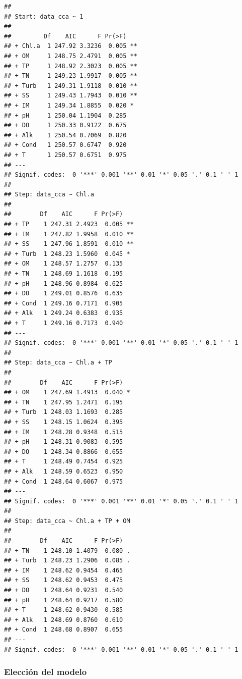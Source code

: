 \documentclass[
]{book}
\begin{document}
\begin{verbatim}
## 
## Start: data_cca ~ 1 
## 
##         Df    AIC      F Pr(>F)   
## + Chl.a  1 247.92 3.3236  0.005 **
## + OM     1 248.75 2.4791  0.005 **
## + TP     1 248.92 2.3023  0.005 **
## + TN     1 249.23 1.9917  0.005 **
## + Turb   1 249.31 1.9118  0.010 **
## + SS     1 249.43 1.7943  0.010 **
## + IM     1 249.34 1.8855  0.020 * 
## + pH     1 250.04 1.1904  0.285   
## + DO     1 250.33 0.9122  0.675   
## + Alk    1 250.54 0.7069  0.820   
## + Cond   1 250.57 0.6747  0.920   
## + T      1 250.57 0.6751  0.975   
## ---
## Signif. codes:  0 '***' 0.001 '**' 0.01 '*' 0.05 '.' 0.1 ' ' 1
## 
## Step: data_cca ~ Chl.a 
## 
##        Df    AIC      F Pr(>F)   
## + TP    1 247.31 2.4923  0.005 **
## + IM    1 247.82 1.9958  0.010 **
## + SS    1 247.96 1.8591  0.010 **
## + Turb  1 248.23 1.5960  0.045 * 
## + OM    1 248.57 1.2757  0.135   
## + TN    1 248.69 1.1618  0.195   
## + pH    1 248.96 0.8984  0.625   
## + DO    1 249.01 0.8576  0.635   
## + Cond  1 249.16 0.7171  0.905   
## + Alk   1 249.24 0.6383  0.935   
## + T     1 249.16 0.7173  0.940   
## ---
## Signif. codes:  0 '***' 0.001 '**' 0.01 '*' 0.05 '.' 0.1 ' ' 1
## 
## Step: data_cca ~ Chl.a + TP 
## 
##        Df    AIC      F Pr(>F)  
## + OM    1 247.69 1.4913  0.040 *
## + TN    1 247.95 1.2471  0.195  
## + Turb  1 248.03 1.1693  0.285  
## + SS    1 248.15 1.0624  0.395  
## + IM    1 248.28 0.9348  0.515  
## + pH    1 248.31 0.9083  0.595  
## + DO    1 248.34 0.8866  0.655  
## + T     1 248.49 0.7454  0.925  
## + Alk   1 248.59 0.6523  0.950  
## + Cond  1 248.64 0.6067  0.975  
## ---
## Signif. codes:  0 '***' 0.001 '**' 0.01 '*' 0.05 '.' 0.1 ' ' 1
## 
## Step: data_cca ~ Chl.a + TP + OM 
## 
##        Df    AIC      F Pr(>F)  
## + TN    1 248.10 1.4079  0.080 .
## + Turb  1 248.23 1.2906  0.085 .
## + IM    1 248.62 0.9454  0.465  
## + SS    1 248.62 0.9453  0.475  
## + DO    1 248.64 0.9231  0.540  
## + pH    1 248.64 0.9217  0.580  
## + T     1 248.62 0.9430  0.585  
## + Alk   1 248.69 0.8760  0.610  
## + Cond  1 248.68 0.8907  0.655  
## ---
## Signif. codes:  0 '***' 0.001 '**' 0.01 '*' 0.05 '.' 0.1 ' ' 1
\end{verbatim}

\hypertarget{elecciuxf3n-del-modelo}{%
\subsubsection{Elección del modelo}\label{elecciuxf3n-del-modelo}}
\end{document}
